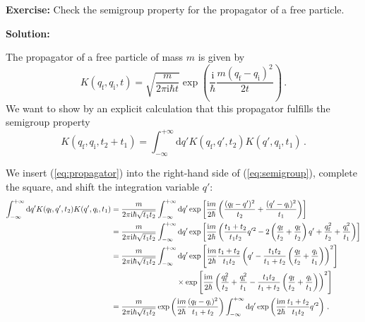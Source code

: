 \documentclass[11pt,DIV=19,parskip=half]{scrartcl}
\begin{document}
\pagestyle{empty}


\vspace{0.5truecm}
\textbf{Exercise:} Check the semigroup property for the propagator of a free particle.

\vspace{0.5truecm}
\textbf{Solution:}

The propagator of a free particle of mass $m$ is given by
\begin{equation}
 \label{eq:propagator}
 K(q_\text{f}, q_\text{i}, t) = \sqrt{\frac{m}{2\pi\text{i}\hbar t}}
      \exp\left(\frac{\text{i}}{\hbar}\frac{m(q_\text{f}-q_\text{i})^2}{2t}\right)\,.
\end{equation}
We want to show by an explicit calculation that this propagator fulfills the semigroup property
\begin{equation}
 \label{eq:semigroup}
 K(q_\text{f}, q_\text{i}, t_2+t_1)
    = \int_{-\infty}^{+\infty}\text{d}q' K(q_\text{f}, q', t_2)K(q', q_\text{i}, t_1)\,.
\end{equation}

We insert (\ref{eq:propagator}) into the right-hand side of (\ref{eq:semigroup}), complete
the square, and shift the integration variable $q'$:
\begin{equation}
 \begin{aligned}
  \int_{-\infty}^{+\infty}\text{d}q' K(q_\text{f}, q', t_2)K(q', q_\text{i}, t_1) &= 
  \frac{m}{2\pi\text{i}\hbar\sqrt{t_1t_2}}\int_{-\infty}^{+\infty}\text{d}q'
    \exp\left[\frac{\text{i}m}{2\hbar}\left(\frac{(q_\text{f}-q')^2}{t_2}+
                                            \frac{(q'-q_\text{i})^2}{t_1}\right)\right]\\
  &= \frac{m}{2\pi\text{i}\hbar\sqrt{t_1t_2}}\int_{-\infty}^{+\infty}\text{d}q'
     \exp\left[\frac{\text{i}m}{2\hbar}\left(\frac{t_1+t_2}{t_1t_2}q'^2
                                    -2\left(\frac{q_\text{f}}{t_2}+\frac{q_\text{f}}{t_2}\right)q'
                                    +\frac{q_\text{f}^2}{t_2}+\frac{q_\text{i}^2}{t_1}
                                    \right)\right]\\
  &= \frac{m}{2\pi\text{i}\hbar\sqrt{t_1t_2}}\int_{-\infty}^{+\infty}\text{d}q'
     \exp\left[\frac{\text{i}m}{2\hbar}\frac{t_1+t_2}{t_1t_2}
                \left(q'-\frac{t_1t_2}{t_1+t_2}\left(\frac{q_\text{f}}{t_2}
                                       +\frac{q_\text{i}}{t_1}\right)\right)^2\right]\\
  &\hspace{3truecm}\times\exp\left[\frac{\text{i}m}{2\hbar}\left(\frac{q_\text{f}^2}{t_2}
                                                                 +\frac{q_\text{i}^2}{t_1}
                         -\frac{t_1t_2}{t_1+t_2}\left(\frac{q_\text{f}}{t_2}
                                                       +\frac{q_\text{i}}{t_1}\right)\right)^2\right]\\
  &= \frac{m}{2\pi\text{i}\hbar\sqrt{t_1t_2}}\exp\left(\frac{\text{i}m}{2\hbar}
                         \frac{(q_\text{f}-q_\text{i})^2}{t_1+t_2}\right)
     \int_{-\infty}^{+\infty}\text{d}q'\exp\left(\frac{\text{i}m}{2\hbar}\frac{t_1+t_2}{t_1t_2}q'^2\right)\,.
 \end{aligned}
\end{equation}
\end{document}
